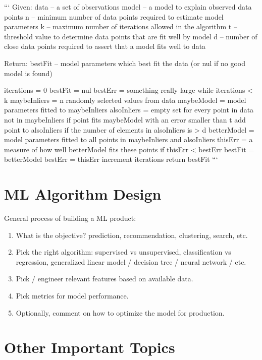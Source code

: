 ```
Given:
    data – a set of observations
    model – a model to explain observed data points
    n – minimum number of data points required to estimate model parameters
    k – maximum number of iterations allowed in the algorithm
    t – threshold value to determine data points that are fit well by model 
    d – number of close data points required to assert that a model fits well to data

Return:
    bestFit – model parameters which best fit the data (or nul if no good model is found)

iterations = 0
bestFit = nul
bestErr = something really large
while iterations < k {
    maybeInliers = n randomly selected values from data
    maybeModel = model parameters fitted to maybeInliers
    alsoInliers = empty set
    for every point in data not in maybeInliers {
        if point fits maybeModel with an error smaller than t
             add point to alsoInliers
    }
    if the number of elements in alsoInliers is > d {
        betterModel = model parameters fitted to all points in maybeInliers and alsoInliers
        thisErr = a measure of how well betterModel fits these points
        if thisErr < bestErr {
            bestFit = betterModel
            bestErr = thisErr
        }
    }
    increment iterations
}
return bestFit
```

\section{ML Algorithm Design}

General process of building a ML product:

\begin{enumerate}
\item What is the objective? prediction, recommendation, clustering, search, etc.
\item Pick the right algorithm: supervised vs unsupervised, classification vs regression, generalized linear model / decision tree / neural network / etc.
\item Pick / engineer relevant features based on available data.
\item Pick metrics for model performance.
\item Optionally, comment on how to optimize the model for production.
\end{enumerate}

\section{Other Important Topics}


